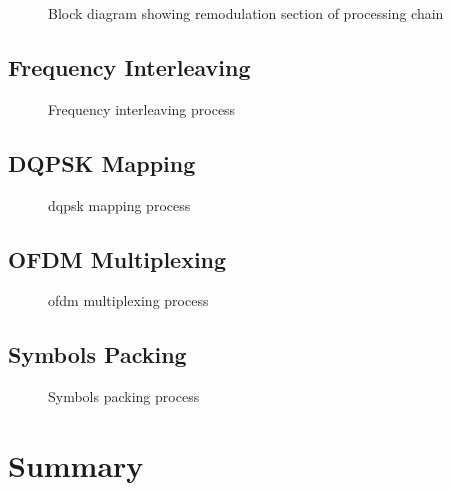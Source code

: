 \documentclass[class=report,11pt,crop=false]{standalone}
\begin{document}
\begin{figure}[htbp]
    \centering
    \captionsetup{type=figure}
    \def\svgwidth{\linewidth}
    { %
        }
    \caption{Block diagram showing remodulation section of processing chain}
    \label{fig:BD_Remod_All}
\end{figure}

\subsection{Frequency Interleaving \label{subsect:dab-proc_freq-interleave}}

\begin{figure}[htbp]
  \centering
  \captionsetup{type=figure}
  \def\svgwidth{\linewidth}
  { %
  }
  \caption{Frequency interleaving process}
  \label{fig:freq_interleave}
\end{figure}

\subsection{DQPSK Mapping \label{subsect:dab-proc_dqpsk-map}}

\begin{figure}[htbp]
  \centering
  \captionsetup{type=figure}
  \def\svgwidth{\linewidth}
  { %
  }
  \caption{\gls{dqpsk} mapping process}
  \label{fig:dqpsk_map}
\end{figure}

\subsection{OFDM Multiplexing \label{subsect:dab-proc_ofdm-mux}}

\begin{figure}[htbp]
  \centering
  \captionsetup{type=figure}
  \def\svgwidth{\linewidth}
  { %
  }
  \caption{\gls{ofdm} multiplexing process}
  \label{fig:ofdm_mux}
\end{figure}

\subsection{Symbols Packing \label{subsect:dab-proc_symbols-pack}}

\begin{figure}[htbp]
  \centering
  \captionsetup{type=figure}
  \def\svgwidth{\linewidth}
  { %
  }
  \caption{Symbols packing process}
  \label{fig:symbols_pack}
\end{figure}

\section{Summary}

\ifstandalone

\printnoidxglossary[type=\acronymtype,nonumberlist]
\fi
\end{document}
